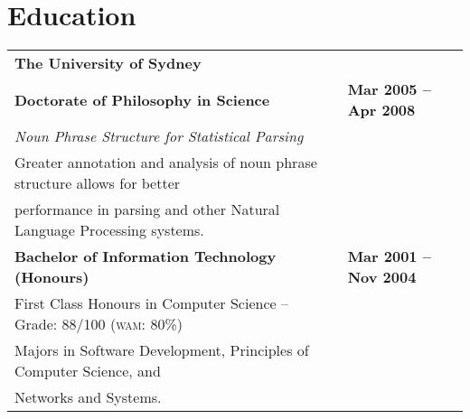\documentclass[]{article}
\begin{document}
\vspace{-0.7cm}
\section*{Education}

\setlength{\tabcolsep}{0.1cm}
\begin{table*}[h!]
\begin{tabular}[h!]{p{12.7cm}l}

\textbf{The University of Sydney} & \\
\textbf{Doctorate of Philosophy in Science} & \textbf{Mar 2005 -- Apr 2008}\\
\hspace{0.5cm}\textit{Noun Phrase Structure for Statistical Parsing} & \\
\hspace{0.5cm}Greater annotation and analysis of noun phrase structure allows for better & \\
\hspace{0.5cm}performance in parsing and other Natural Language Processing systems. & \\

\textbf{Bachelor of Information Technology (Honours)} & \textbf{Mar 2001 -- Nov 2004}\\
\hspace{0.5cm}First Class Honours in Computer Science -- Grade: 88/100 (\textsc{wam}: 80\%) & \\
\hspace{0.5cm}Majors in Software Development, Principles of Computer Science, and & \\
\hspace{0.5cm}Networks and Systems. & \\


\end{tabular}
\end{table*}
\end{document}
